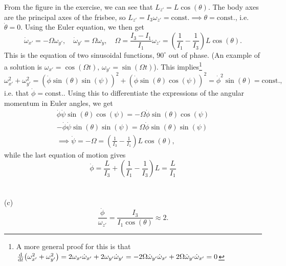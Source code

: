 \documentclass{article}
\begin{document}
        From the figure in the exercise, we can see that $L_{z'} = L \cos(\theta)$. The body axes are the principal axes of the frisbee, so $L_{z'} = I_3 \omega_{z'} = \mathrm{const.} \implies \theta = \mathrm{const.}$, i.e. $\dot \theta = 0$. Using the Euler equation, we then get
        \begin{equation*}
            \dot \omega_{x'} = -\Omega \omega_{y'}, \quad \dot \omega_{y'} = \Omega \omega_{y}, \quad \Omega = \frac{I_3 - I_1}{I_1} \omega_{z'} = \left(\frac{1}{I_1} - \frac{1}{I_3}\right) L \cos(\theta).
        \end{equation*}
        This is the equation of two sinusoidal functions, $90^\circ$ out of phase. (An example of a solution is $\omega_{x'} = \cos(\Omega t),\, \omega_{y'} = \sin(\Omega t)$). This implies\footnote{A more general proof for this is that $\dv t (\omega_{x'}^2 + \omega_{y'}^2) = 2\omega_{x'} \dot \omega_{x'} + 2 \omega_{y'} \dot \omega_{y'} = -2\Omega \dot \omega_{y'} \dot \omega_{x'} + 2\Omega \dot \omega_{y'} \dot \omega_{x'} = 0$ }
        \begin{equation*}
            \omega_{x'}^2 + \omega_{y'}^2 = \left( \dot \phi \sin(\theta) \sin(\psi) \right)^2 + \left( \dot \phi \sin(\theta)\cos(\psi) \right)^2 = \dot \phi^2 \sin(\theta) = \mathrm{const.},
        \end{equation*}
        i.e. that $\dot \phi = \mathrm{const.}$. Using this to differentiate the expressions of the angular momentum in Euler angles, we get
        \begin{align*}
            \dot \phi \dot \psi \sin(\theta)\cos(\psi) = -\Omega \dot \phi \sin(\theta)\cos(\psi) \\
            -\dot \phi \dot \psi \sin(\theta)\sin(\psi) = \Omega \dot \phi \sin(\theta)\sin(\psi) \\
            \implies \dot \psi = -\Omega = \left(\frac{1}{I_3} - \frac{1}{I_1}\right) L \cos(\theta),
        \end{align*}
        while the last equation of motion gives
        \begin{equation*}
            \dot \phi = \frac{L}{I_3} + \left(\frac{1}{I_1} - \frac{1}{I_3}\right) L = \frac{L}{I_1}
        \end{equation*}
        \\ \\
        (c)
        \begin{equation*}
            \frac{\dot \phi}{\omega_{z'}} = \frac{I_3}{I_1 \cos(\theta)} \approx 2.
        \end{equation*}
\end{document}
